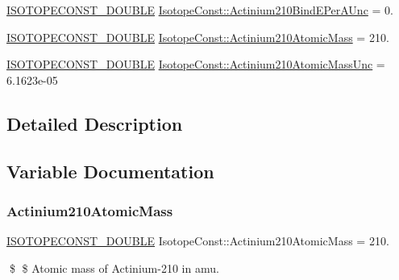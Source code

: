 \begin{DoxyCompactItemize}
\mbox{\hyperlink{group___isotope_const-_macros_ga8f45a7272ce02c0b4c65c44636ed719a}{I\+S\+O\+T\+O\+P\+E\+C\+O\+N\+S\+T\+\_\+\+D\+O\+U\+B\+LE}} \mbox{\hyperlink{group___isotope_const-_actinium-_ac210_ga94e6e0292e91550454c8653379c2b3e7}{Isotope\+Const\+::\+Actinium210\+Bind\+E\+Per\+A\+Unc}} = 0.
\item 
\mbox{\hyperlink{group___isotope_const-_macros_ga8f45a7272ce02c0b4c65c44636ed719a}{I\+S\+O\+T\+O\+P\+E\+C\+O\+N\+S\+T\+\_\+\+D\+O\+U\+B\+LE}} \mbox{\hyperlink{group___isotope_const-_actinium-_ac210_gabbe195fa033914b724211a6c45c3bffc}{Isotope\+Const\+::\+Actinium210\+Atomic\+Mass}} = 210.
\item 
\mbox{\hyperlink{group___isotope_const-_macros_ga8f45a7272ce02c0b4c65c44636ed719a}{I\+S\+O\+T\+O\+P\+E\+C\+O\+N\+S\+T\+\_\+\+D\+O\+U\+B\+LE}} \mbox{\hyperlink{group___isotope_const-_actinium-_ac210_ga9e3a2bb3f88706b415a909889007b797}{Isotope\+Const\+::\+Actinium210\+Atomic\+Mass\+Unc}} = 6.\+1623e-\/05
\end{DoxyCompactItemize}


\subsection{Detailed Description}


\subsection{Variable Documentation}
\mbox{\label{group___isotope_const-_actinium-_ac210_gabbe195fa033914b724211a6c45c3bffc}} 
\subsubsection{\texorpdfstring{Actinium210\+Atomic\+Mass}{Actinium210AtomicMass}}
{\footnotesize\ttfamily \mbox{\hyperlink{group___isotope_const-_macros_ga8f45a7272ce02c0b4c65c44636ed719a}{I\+S\+O\+T\+O\+P\+E\+C\+O\+N\+S\+T\+\_\+\+D\+O\+U\+B\+LE}} Isotope\+Const\+::\+Actinium210\+Atomic\+Mass = 210.}

\$ \$ Atomic mass of Actinium-\/210 in amu. \mbox{\label{group___isotope_const-_actinium-_ac210_ga9e3a2bb3f88706b415a909889007b797}} 
